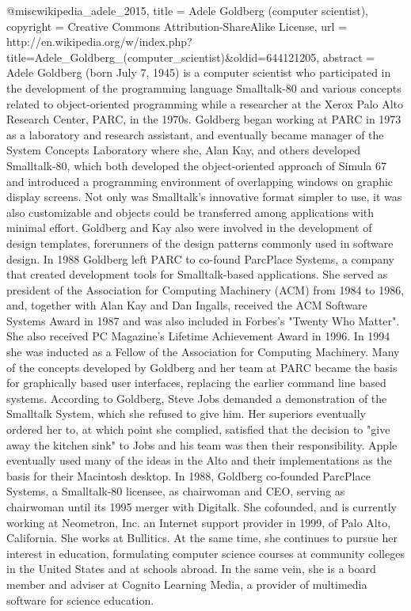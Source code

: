 {@misc{wikipedia_adele_2015,
  title     = {Adele {Goldberg} (computer scientist)},
  copyright = {Creative Commons Attribution-ShareAlike License},
  url       = {http://en.wikipedia.org/w/index.php?title=Adele_Goldberg_(computer_scientist)&oldid=644121205},
  abstract  = {Adele Goldberg (born July 7, 1945) is a computer scientist who participated in the development of the programming language Smalltalk-80 and various concepts related to object-oriented programming while a researcher at the Xerox Palo Alto Research Center, PARC, in the 1970s.
Goldberg began working at PARC in 1973 as a laboratory and research assistant, and eventually became manager of the System Concepts Laboratory where she, Alan Kay, and others developed Smalltalk-80, which both developed the object-oriented approach of Simula 67 and introduced a programming environment of overlapping windows on graphic display screens. Not only was Smalltalk's innovative format simpler to use, it was also customizable and objects could be transferred among applications with minimal effort. Goldberg and Kay also were involved in the development of design templates, forerunners of the design patterns commonly used in software design. In 1988 Goldberg left PARC to co-found ParcPlace Systems, a company that created development tools for Smalltalk-based applications.
She served as president of the Association for Computing Machinery (ACM) from 1984 to 1986, and, together with Alan Kay and Dan Ingalls, received the ACM Software Systems Award in 1987 and was also included in Forbes's "Twenty Who Matter". She also received PC Magazine's Lifetime Achievement Award in 1996. In 1994 she was inducted as a Fellow of the Association for Computing Machinery.
Many of the concepts developed by Goldberg and her team at PARC became the basis for graphically based user interfaces, replacing the earlier command line based systems. According to Goldberg, Steve Jobs demanded a demonstration of the Smalltalk System, which she refused to give him. Her superiors eventually ordered her to, at which point she complied, satisfied that the decision to "give away the kitchen sink" to Jobs and his team was then their responsibility. Apple eventually used many of the ideas in the Alto and their implementations as the basis for their Macintosh desktop.
In 1988, Goldberg co-founded ParcPlace Systems, a Smalltalk-80 licensee, as chairwoman and CEO, serving as chairwoman until its 1995 merger with Digitalk.
She cofounded, and is currently working at Neometron, Inc. an Internet support provider in 1999, of Palo Alto, California. She works at Bullitics. At the same time, she continues to pursue her interest in education, formulating computer science courses at community colleges in the United States and at schools abroad. In the same vein, she is a board member and adviser at Cognito Learning Media, a provider of multimedia software for science education.
}}}
